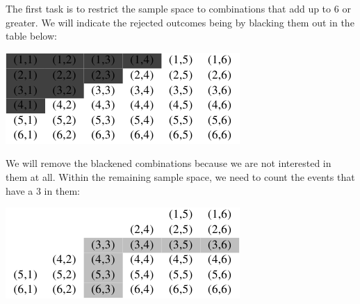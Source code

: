 \documentclass{ximera}
\begin{document}
The first task is to restrict the sample space to combinations that add up to 6 or greater. We will indicate the rejected outcomes being by blacking them out in the table below:
\begin{image}
\includegraphics{ConditionalProbTable2.png}%
\end{image}
We will remove the blackened combinations because we are not interested in them at all. Within the remaining sample space, we need to count the events that have a 3 in them:
\begin{image}
\includegraphics{ConditionalProbTable3.png}
\end{image}
\end{document}
